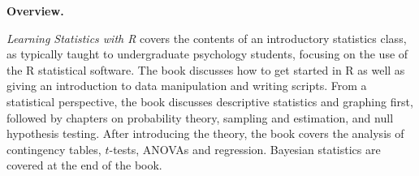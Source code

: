 

\clearpage
\newpage

\begin{center}
{\bf Overview.}
\end{center}

{\it Learning Statistics with R} covers the contents of an introductory statistics class, as typically taught to undergraduate psychology students, focusing on the use of the R statistical software. The book discusses how to get started in R as well as giving an introduction to data manipulation and writing scripts. From a statistical perspective, the book discusses descriptive statistics and graphing first, followed by chapters on probability theory, sampling and estimation, and null hypothesis testing. After introducing the theory, the book covers the analysis of contingency tables, $t$-tests, ANOVAs and regression. Bayesian statistics are covered at the end of the book. 

